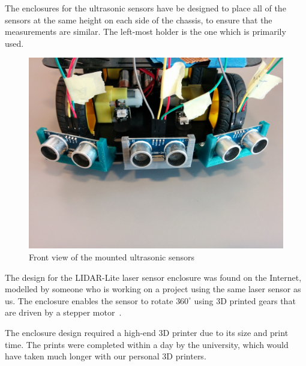 The enclosures for the ultrasonic sensors have be designed to place all of the sensors at the same height on each side of the chassis, to ensure that the measurements are similar. The left-most holder is the one which is primarily used.

\begin{figure}[H]
	\centering
	\includegraphics[width=.6\linewidth]{images/mounted_ultrasonic_sensors.jpg}
	\caption{Front view of the mounted ultrasonic sensors}
	\label{fig:ultrasonic-mounted}
\end{figure}

The design for the LIDAR-Lite laser sensor enclosure was found on the Internet, modelled by someone who is working on a project using the same laser sensor as us. The enclosure enables the sensor to rotate $360^\circ$ using 3D printed gears that are driven by a stepper motor~\cite{lidarenclosure}.

The enclosure design required a high-end 3D printer due to its size and print time. The prints were completed within a day by the university, which would have taken much longer with our personal 3D printers.

